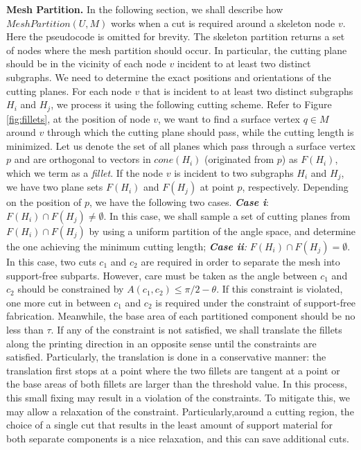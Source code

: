 \textbf{Mesh Partition.}
{{In the following section, we shall describe how $MeshPartition(U , M)$ works when a cut is required around a skeleton node $v$. Here the pseudocode is omitted for brevity.}}
The skeleton partition returns a set of nodes where the mesh partition should occur. In particular, the cutting plane should be in the vicinity of each node $v$ incident to at least two distinct subgraphs. We need to determine the exact positions and orientations of the cutting planes. For each node $v$ that is incident to at least two distinct subgraphs $H_i$ and $H_j$, we process it using the following cutting scheme.
Refer to Figure \ref{fig:fillets}, at the position of node $v$, we want to find a surface vertex $q \in M$ around $v$ through which the cutting plane should pass, while the cutting length is minimized. Let us denote the set of all planes which pass through a surface vertex $p$ and are orthogonal to vectors in $cone(H_i)$ (originated from $p$) as $F(H_i)$, which we term as a \emph{fillet}. If the node $v$ is incident to two subgraphs $H_i$ and $H_j$, we have two plane sets $F(H_i)$ and $F(H_j)$ at point $p$, respectively. Depending on the position of $p$, we have the following two cases. \emph{\textbf{Case i}}: $F(H_i) \cap F(H_j) \neq \emptyset$. In this case, we shall sample a set of cutting planes from $F(H_i) \cap F(H_j)$ by using a uniform partition of the angle space, and determine the one achieving the minimum cutting length; \emph{\textbf{Case ii}:} $F(H_i) \cap F(H_j) = \emptyset$. In this case, two cuts $c_1$ and $c_2$ are required in order to separate the mesh into support-free subparts. However, care must be taken as the angle between $c_1$ and $c_2$ should be constrained by $A(c_1, c_2) \leq \pi/2-\theta$. If this constraint is violated, one more cut in between $c_1$ and $c_2$ is required under the constraint of support-free fabrication. Meanwhile, the base area of each partitioned component should be no less than $\tau$. If any of the constraint is not satisfied, we shall translate the fillets along the printing direction in an opposite sense until the constraints are satisfied. Particularly, the translation is done in a conservative manner: the translation first stops at a point where the two fillets are tangent at a point or the base areas of both fillets are larger than the threshold value. In this process, this small fixing may result in a violation of the constraints. To mitigate this, we may allow a relaxation of the constraint. Particularly,around a cutting region, the choice of a single cut that results in the least amount of support material for both separate components is a nice relaxation, and this can save additional cuts.

